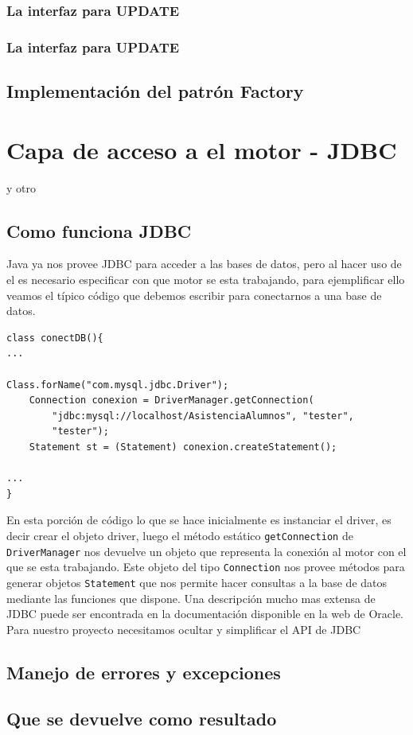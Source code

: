 \subsubsection{La interfaz para UPDATE}
\subsubsection{La interfaz para UPDATE}
\subsection{Implementación del patrón Factory}










\section{Capa de acceso a el motor - JDBC}
y otro

\subsection{Como funciona JDBC}
Java ya nos provee JDBC para acceder a las bases de datos, pero al hacer uso de el es necesario especificar con que motor se esta trabajando, para ejemplificar ello veamos el típico código que debemos escribir para conectarnos a una base de datos.

\begin{lstlisting}[title=Porción de codigo java para la conexión a una base de datos]
class conectDB(){
...

Class.forName("com.mysql.jdbc.Driver");
	Connection conexion = DriverManager.getConnection(
		"jdbc:mysql://localhost/AsistenciaAlumnos", "tester",
		"tester");
	Statement st = (Statement) conexion.createStatement();

...
}
\end{lstlisting}

En esta porción de código lo que se hace inicialmente es instanciar el driver, es decir crear el objeto driver, luego el método estático \verb=getConnection= de 	\verb=DriverManager= nos devuelve un objeto que representa la conexión al motor con el que se esta trabajando. Este objeto del tipo \verb=Connection= nos provee métodos para generar objetos \verb=Statement= que nos permite hacer consultas a la base de datos mediante las funciones que dispone. Una descripción mucho mas extensa de JDBC puede ser encontrada en la documentación disponible en la web de Oracle\citep{java:jdbc}.
Para nuestro proyecto necesitamos ocultar y simplificar el API de JDBC
\subsection{Manejo de errores y excepciones}

\subsection{Que se devuelve como resultado}
